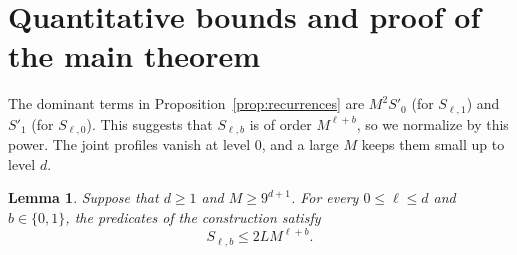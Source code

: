 \documentclass[11pt]{article}
\newtheorem{lemma}[theorem]{Lemma}
\theoremstyle{definition}
\theoremstyle{remark}
\begin{document}
\section{Quantitative bounds and proof of the main theorem}
\label{sec:separation}

The dominant terms in Proposition~\ref{prop:recurrences} are \(M^2S'_0\) (for \(S_{\ell,1}\)) and \(S'_1\) (for \(S_{\ell,0}\)).
This suggests that \(S_{\ell,b}\) is of order \(M^{\ell+b}\), so we normalize by this power.
The joint profiles vanish at level \(0\), and a large \(M\) keeps them small up to level \(d\).

\begin{lemma}
\label{lem:quantitative-profiles}
Suppose that $d\geq 1$ and $M\geq 9^{d+1}$.
For every $0\leq\ell\leq d$ and $b\in\{0,1\}$, the predicates of the
construction satisfy
\[
  S_{\ell,b}\leq 2L M^{\ell+b}.
\]
\end{lemma}
\end{document}
